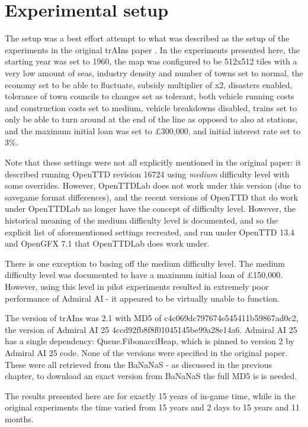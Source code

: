 \documentclass[logo,msc,dsti]{infthesis}    %
\begin{document}
{\section{Experimental setup}

The setup was a best effort attempt to what was described as the setup of the experiments in the original trAIns paper \cite{rios2009trains}. In the experiments presented here, the starting year was set to 1960, the map was configured to be 512x512 tiles with a very low amount of seas, industry density and number of towns set to normal, the economy set to be able to fluctuate, subsidy multiplier of x2, disasters enabled, tolerance of town councils to changes set as tolerant, both vehicle running costs and construction costs set to medium, vehicle breakdowns disabled, trains set to only be able to turn around at the end of the line as opposed to also at stations, and the maximum initial loan was set to £300,000, and initial interest rate set to 3\%.

Note that these settings were not all explicitly mentioned in the original paper: it described running OpenTTD revision 16724 using \emph{medium} difficulty level with some overrides. However, OpenTTDLab does not work under this version (due to savegame format differences), and the recent versions of OpenTTD that do work under OpenTTDLab no longer have the concept of difficulty level. However, the historical meaning of the medium difficulty level is documented, and so the explicit list of aforementioned settings recreated, and run under OpenTTD 13.4 and OpenGFX 7.1 that OpenTTDLab does work under.

There is one exception to basing off the medium difficulty level. The medium difficulty level was documented to have a maximum initial loan of £150,000. However, using this level in pilot experiments resulted in extremely poor performance of Admiral AI - it appeared to be virtually unable to function.

The version of trAIns was 2.1 with MD5 of c4c069dc797674e545411b59867ad0c2,  the version of Admiral AI 25 4ccd92fb8f8f01045145be99a28e14a6. Admiral AI 25 has a single dependency: Queue.FibonacciHeap, which is pinned to version 2 by Admiral AI 25 code. None of the versions were specified in the original paper. These were all retrieved from the BaNaNaS - as discussed in the previous chapter, to download an exact version from BaNaNaS the full MD5 is is needed.

The results presented here are for exactly 15 years of in-game time, while in the original experiments the time varied from 15 years and 2 days to 15 years and 11 months.

}
\end{document}
